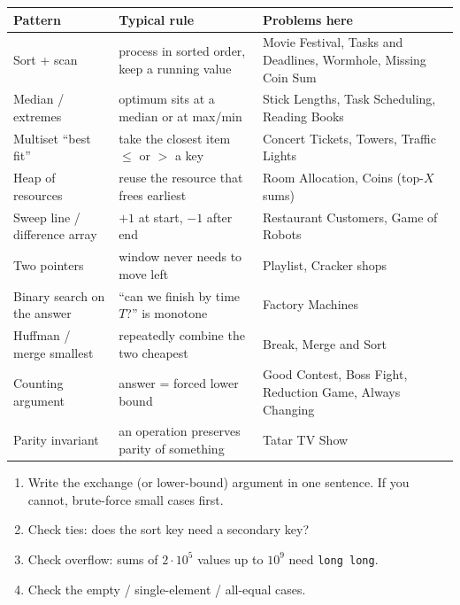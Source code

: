 \begin{center}
\renewcommand{\arraystretch}{1.25}
\begin{tabular}{p{4.2cm}p{5.2cm}p{4.3cm}}
\toprule
\textbf{Pattern} & \textbf{Typical rule} & \textbf{Problems here}\\
\midrule
Sort + scan & process in sorted order, keep a running value & Movie Festival, Tasks and Deadlines, Wormhole, Missing Coin Sum\\
Median / extremes & optimum sits at a median or at max/min & Stick Lengths, Task Scheduling, Reading Books\\
Multiset ``best fit'' & take the closest item $\le$ or $>$ a key & Concert Tickets, Towers, Traffic Lights\\
Heap of resources & reuse the resource that frees earliest & Room Allocation, Coins (top-$X$ sums)\\
Sweep line / difference array & $+1$ at start, $-1$ after end & Restaurant Customers, Game of Robots\\
Two pointers & window never needs to move left & Playlist, Cracker shops\\
Binary search on the answer & ``can we finish by time $T$?'' is monotone & Factory Machines\\
Huffman / merge smallest & repeatedly combine the two cheapest & Break, Merge and Sort\\
Counting argument & answer = forced lower bound & Good Contest, Boss Fight, Reduction Game, Always Changing\\
Parity invariant & an operation preserves parity of something & Tatar TV Show\\
\bottomrule
\end{tabular}
\end{center}

\begin{takeawaybox}
\begin{enumerate}
  \item Write the exchange (or lower-bound) argument in one sentence. If
        you cannot, brute-force small cases first.
  \item Check ties: does the sort key need a secondary key?
  \item Check overflow: sums of $2\cdot10^5$ values up to $10^9$ need
        \texttt{long long}.
  \item Check the empty / single-element / all-equal cases.
\end{enumerate}
\end{takeawaybox}

